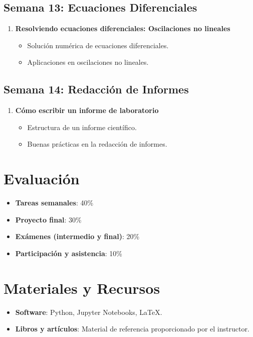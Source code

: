 \documentclass{article}
\begin{document}
\subsection*{Semana 13: Ecuaciones Diferenciales}
\begin{enumerate}
    \item \textbf{Resolviendo ecuaciones diferenciales: Oscilaciones no lineales}
    \begin{itemize}
        \item Solución numérica de ecuaciones diferenciales.
        \item Aplicaciones en oscilaciones no lineales.
    \end{itemize}
\end{enumerate}


\subsection*{Semana 14: Redacción de Informes}
\begin{enumerate}
    \item \textbf{Cómo escribir un informe de laboratorio}
    \begin{itemize}
        \item Estructura de un informe científico.
        \item Buenas prácticas en la redacción de informes.
    \end{itemize}
\end{enumerate}


\section*{Evaluación}
\begin{itemize}
    \item \textbf{Tareas semanales}: 40\%
    \item \textbf{Proyecto final}: 30\%
    \item \textbf{Exámenes (intermedio y final)}: 20\%
    \item \textbf{Participación y asistencia}: 10\%
\end{itemize}

\section*{Materiales y Recursos}
\begin{itemize}
    \item \textbf{Software}: Python, Jupyter Notebooks, LaTeX.
    \item \textbf{Libros y artículos}: Material de referencia proporcionado por el instructor.
\end{itemize}
\end{document}
